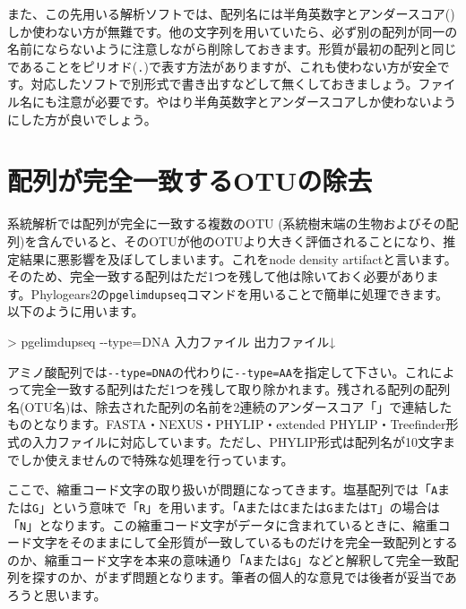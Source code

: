 \documentclass[titlepage,10pt,a4paper]{jsbook}
\newenvironment{cmd}{\begin{oframed}\raggedright\ttfamily\footnotesize\setlength{\baselineskip}{1.4em}}{\end{oframed}\vspace{-1em}}
\begin{document}
また、この先用いる解析ソフトでは、配列名には半角英数字とアンダースコア(\texttt{\textunderscore})しか使わない方が無難です。他の文字列を用いていたら、必ず別の配列が同一の名前にならないように注意しながら削除しておきます。形質が最初の配列と同じであることをピリオド(\texttt{.})で表す方法がありますが、これも使わない方が安全です。対応したソフトで別形式で書き出すなどして無くしておきましょう。ファイル名にも注意が必要です。やはり半角英数字とアンダースコアしか使わないようにした方が良いでしょう。

\section{配列が完全一致するOTUの除去}

系統解析では配列が完全に一致する複数のOTU (系統樹末端の生物およびその配列)を含んでいると、そのOTUが他のOTUより大きく評価されることになり、推定結果に悪影響を及ぼしてしまいます。これをnode density artifactと言います\citep{Webster2003,Venditti2006}。そのため、完全一致する配列はただ1つを残して他は除いておく必要があります。Phylogears2の\texttt{pgelimdupseq}コマンドを用いることで簡単に処理できます。以下のように用います。
\begin{cmd}
{\textgreater} pgelimdupseq {-}{-}type=DNA 入力ファイル 出力ファイル↓
\end{cmd}
アミノ酸配列では\texttt{{-}{-}type=DNA}の代わりに\texttt{{-}{-}type=AA}を指定して下さい。これによって完全一致する配列はただ1つを残して取り除かれます。残される配列の配列名(OTU名)は、除去された配列の名前を2連続のアンダースコア「\texttt{{\textunderscore}{\textunderscore}}」で連結したものとなります。FASTA・NEXUS・PHYLIP・extended PHYLIP・Treefinder形式の入力ファイルに対応しています。ただし、PHYLIP形式は配列名が10文字までしか使えませんので特殊な処理を行っています。

ここで、縮重コード文字の取り扱いが問題になってきます。塩基配列では「\texttt{A}または\texttt{G}」という意味で「\texttt{R}」を用います。「\texttt{A}または\texttt{C}または\texttt{G}または\texttt{T}」の場合は「\texttt{N}」となります。この縮重コード文字がデータに含まれているときに、縮重コード文字をそのままにして全形質が一致しているものだけを完全一致配列とするのか、縮重コード文字を本来の意味通り「\texttt{A}または\texttt{G}」などと解釈して完全一致配列を探すのか、がまず問題となります。筆者の個人的な意見では後者が妥当であろうと思います。
\end{document}
